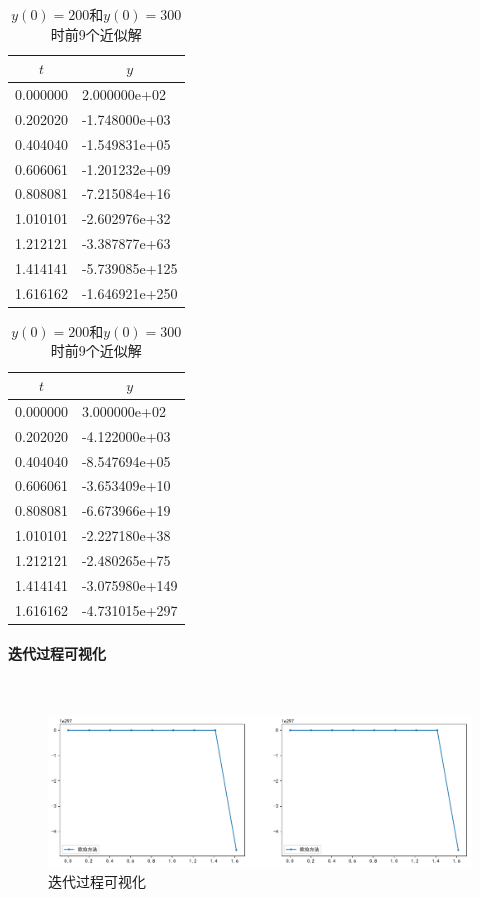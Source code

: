 \begin{table}[H]
	\centering
	\caption{$y(0)=200$和$y(0)=300$时前9个近似解}
	\begin{tabular}{ll}
		\hline
		\multicolumn{1}{c}{$t$} & \multicolumn{1}{c}{$y$} \\ \hline
		0.000000 & 2.000000e+02   \\
		0.202020 & -1.748000e+03  \\
		0.404040 & -1.549831e+05  \\
		0.606061 & -1.201232e+09  \\
		0.808081 & -7.215084e+16  \\
		1.010101 & -2.602976e+32  \\
		1.212121 & -3.387877e+63  \\
		1.414141 & -5.739085e+125 \\
		1.616162 & -1.646921e+250 \\ \hline
	\end{tabular}
\quad
	\begin{tabular}{ll}
		\hline
		\multicolumn{1}{c}{$t$} & \multicolumn{1}{c}{$y$} \\ \hline
		0.000000 & 3.000000e+02   \\
		0.202020 & -4.122000e+03  \\
		0.404040 & -8.547694e+05  \\
		0.606061 & -3.653409e+10  \\
		0.808081 & -6.673966e+19  \\
		1.010101 & -2.227180e+38  \\
		1.212121 & -2.480265e+75  \\
		1.414141 & -3.075980e+149 \\
		1.616162 & -4.731015e+297 \\ \hline
	\end{tabular}
\end{table}

\paragraph{迭代过程可视化}
~\\
\begin{figure}[H]
	\centering
	\caption{迭代过程可视化}
	\includegraphics[width=\linewidth]{fig32.pdf}
\end{figure}

